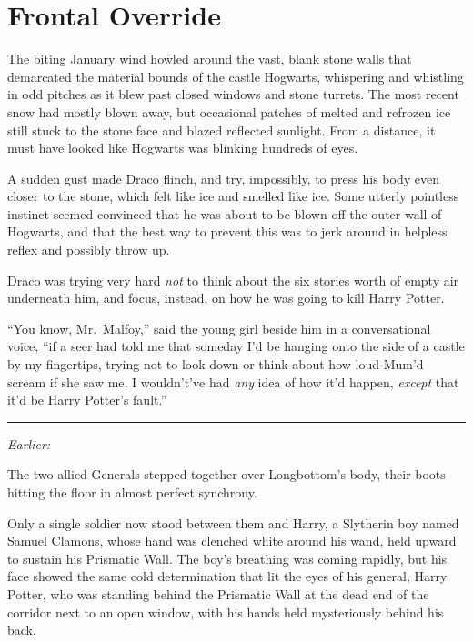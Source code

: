 \chapter{Frontal Override}

The biting January wind howled around the vast, blank stone walls that
demarcated the material bounds of the castle Hogwarts, whispering and
whistling in odd pitches as it blew past closed windows and stone
turrets. The most recent snow had mostly blown away, but occasional
patches of melted and refrozen ice still stuck to the stone face and
blazed reflected sunlight. From a distance, it must have looked like
Hogwarts was blinking hundreds of eyes.

A sudden gust made Draco flinch, and try, impossibly, to press his body
even closer to the stone, which felt like ice and smelled like ice. Some
utterly pointless instinct seemed convinced that he was about to be
blown off the outer wall of Hogwarts, and that the best way to prevent
this was to jerk around in helpless reflex and possibly throw up.

Draco was trying very hard \emph{not} to think about the six stories
worth of empty air underneath him, and focus, instead, on how he was
going to kill Harry Potter.

``You know, Mr.~Malfoy,'' said the young girl beside him in a
conversational voice, ``if a seer had told me that someday I'd be
hanging onto the side of a castle by my fingertips, trying not to look
down or think about how loud Mum'd scream if she saw me, I wouldn't've
had \emph{any} idea of how it'd happen, \emph{except} that it'd be Harry
Potter's fault.''

\begin{center}\rule{3in}{0.4pt}\end{center}

\emph{Earlier:}

The two allied Generals stepped together over Longbottom's body, their
boots hitting the floor in almost perfect synchrony.

Only a single soldier now stood between them and Harry, a Slytherin boy
named Samuel Clamons, whose hand was clenched white around his wand,
held upward to sustain his Prismatic Wall. The boy's breathing was
coming rapidly, but his face showed the same cold determination that lit
the eyes of his general, Harry Potter, who was standing behind the
Prismatic Wall at the dead end of the corridor next to an open window,
with his hands held mysteriously behind his back.

